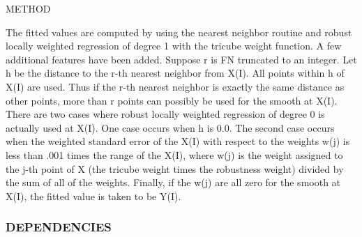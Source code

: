 \begin{DoxyVerb}
METHOD

    The fitted values are computed by using the nearest neighbor
    routine and robust locally weighted regression of degree 1
    with the tricube weight function. A few additional features
    have been added. Suppose r is FN truncated to an integer.
    Let h be the distance to the r-th nearest neighbor
    from X(I). All points within h of X(I) are used. Thus if
    the r-th nearest neighbor is exactly the same distance as
    other points, more than r points can possibly be used for
    the smooth at X(I). There are two cases where robust
    locally weighted regression of degree 0 is actually used at
    X(I). One case occurs when h is 0.0. The second case
    occurs when the weighted standard error of the X(I) with
    respect to the weights w(j) is less than .001 times the
    range of the X(I), where w(j) is the weight assigned to the
    j-th point of X (the tricube weight times the robustness
    weight) divided by the sum of all of the weights. Finally,
    if the w(j) are all zero for the smooth at X(I), the fitted
    value is taken to be Y(I).
\end{DoxyVerb}


\subsubsection*{D\+E\+P\+E\+N\+D\+E\+N\+C\+I\+ES}

